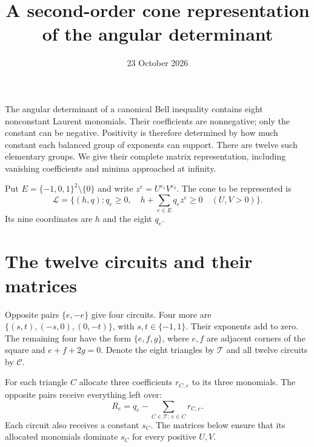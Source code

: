 \documentclass[11pt]{article}
\title{A second-order cone representation of the angular determinant}
\author{}
\date{23 October 2026}
\begin{document}
\maketitle
\vspace{-2em}

The angular determinant of a canonical Bell inequality contains eight
nonconstant Laurent monomials. Their coefficients are nonnegative;
only the constant can be negative. Positivity is therefore determined by
how much constant each balanced group of exponents can support. There are
twelve such elementary groups. We give their complete matrix representation,
including vanishing coefficients and minima approached at infinity.

Put $E=\{-1,0,1\}^2\setminus\{0\}$ and write $z^e=U^{e_1}V^{e_2}$.
The cone to be represented is
\begin{equation}\label{eq:cone}
 \mathcal L=\{(h,q):q_e\ge0,\quad
             h+\sum_{e\in E}q_ez^e\ge0\quad(U,V>0)\}.
\end{equation}
Its nine coordinates are $h$ and the eight $q_e$.

\section{The twelve circuits and their matrices}

Opposite pairs $\{e,-e\}$ give four circuits. Four more are
$\{(s,t),(-s,0),(0,-t)\}$, with $s,t\in\{-1,1\}$.
Their exponents add to zero. The remaining four have the form
$\{e,f,g\}$, where $e,f$ are adjacent corners of the square and
$e+f+2g=0$. Denote the eight triangles by $\mathcal T$ and all
twelve circuits by $\mathcal C$.

For each triangle $C$ allocate three coefficients $r_{C,e}$ to its
three monomials. The opposite pairs receive everything left over:
\begin{equation}\label{eq:residual}
 R_e=q_e-\sum_{C\in\mathcal T:\,e\in C}r_{C,e}.
\end{equation}
Each circuit also receives a constant $s_C$. The matrices below ensure
that its allocated monomials dominate $s_C$ for every positive $U,V$.
\end{document}
